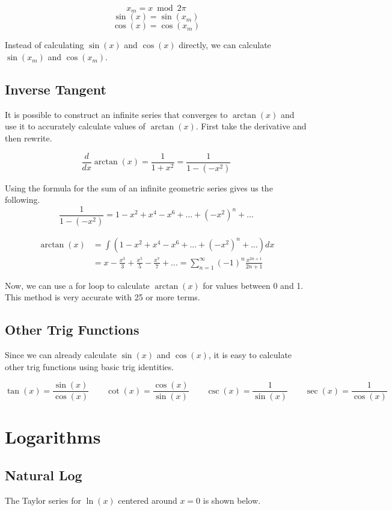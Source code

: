 \documentclass[12pt, letterpaper]{article}
\begin{document}
\[ x_m = x \bmod{2\pi} \]
\[ \sin(x) = \sin(x_m) \]
\[ \cos(x) = \cos(x_m) \]

Instead of calculating $\sin(x)$ and $\cos(x)$ directly, we can calculate $\sin(x_m)$ and $\cos(x_m)$.

\subsection{Inverse Tangent}
It is possible to construct an infinite series that converges to $\arctan(x)$ and use it to accurately calculate values of $\arctan(x)$. First take the derivative and then rewrite.

\[ \frac{d}{dx} \arctan(x) = \frac{1}{1 + x^2} = \frac{1}{1 - (-x^2)}\]

Using the formula for the sum of an infinite geometric series gives us the following.
\[ \frac{1}{1 - (-x^2)} = 1 - x^2 + x^4 - x^6 + ... + (-x^2)^n + ... \]

\begin{align*}
  \arctan(x) &= \int \left(1 - x^2 + x^4 - x^6 + ... + (-x^2)^n + ...\right)dx \\ 
  &= x - \frac{x^3}{3} + \frac{x^5}{5} - \frac{x^7}{7} + ... = \sum_{n=1}^{\infty}\left(-1\right)^{n}\frac{x^{2n+1}}{2n+1}
\end{align*}

Now, we can use a for loop to calculate $\arctan(x)$ for values between 0 and 1. This method is very accurate with 25 or more terms.

\subsection{Other Trig Functions}
Since we can already calculate $\sin(x)$ and $\cos(x)$, it is easy to calculate other trig functions using basic trig identities.

\[ \tan(x) = \frac{\sin(x)}{\cos(x)} \qquad \cot(x) = \frac{\cos(x)}{\sin(x)}  \qquad \csc(x) = \frac{1}{\sin(x)} \qquad \sec(x) = \frac{1}{\cos(x)}
\]

\section{Logarithms}
\subsection{Natural Log}
The Taylor series for $\ln(x)$ centered around $x=0$ is shown below.
\end{document}
